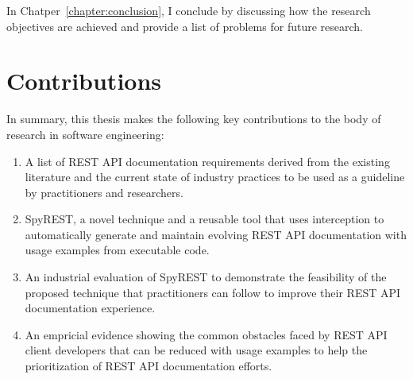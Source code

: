 In Chatper~\ref{chapter:conclusion}, I conclude by discussing how the research objectives are achieved and provide a list of problems for future research.

\section{Contributions}
In summary, this thesis makes the following key contributions to the body of research in software engineering:


\begin{enumerate}
  \item A list of REST API documentation requirements derived from the existing literature and the current state of industry practices to be used as a guideline by practitioners and researchers.
  \item SpyREST, a novel technique and a reusable tool that uses interception to automatically generate and maintain evolving REST API documentation with usage examples from executable code.
  \item An industrial evaluation of SpyREST to demonstrate the feasibility of the proposed technique that practitioners can follow to improve their REST API documentation experience.
  \item An empricial evidence showing the common obstacles faced by REST API client developers that can be reduced with usage examples to help the prioritization of REST API documentation efforts.
\end{enumerate}






